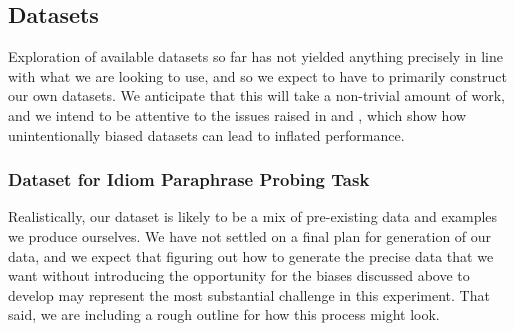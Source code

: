 \documentclass[11pt,a4paper]{article}
\begin{document}
\subsection{Datasets}
Exploration of available datasets so far has not yielded anything precisely in line with what we are looking to use, and so we expect to have to primarily construct our own datasets. We anticipate that this will take a non-trivial amount of work, and we intend to be attentive to the issues raised in \citet{niven2019probing} and \citet{mccoy2019right}, which show how unintentionally biased datasets can lead to inflated performance.
\subsubsection{Dataset for Idiom Paraphrase Probing Task}
Realistically, our dataset is likely to be a mix of pre-existing data and examples we produce ourselves. We have not settled on a final plan for generation of our data, and we expect that figuring out how to generate the precise data that we want without introducing the opportunity for the biases discussed above to develop may represent the most substantial challenge in this experiment. That said, we are including a rough outline for how this process might look. 
\end{document}
